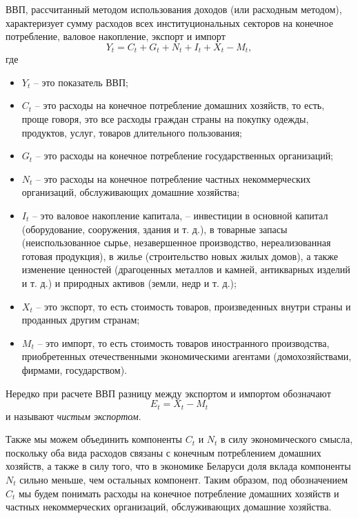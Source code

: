 \documentclass[a4paper, 14pt]{extreport}
\numberwithin{equation}{section}
\numberwithin{equation}{section}
\begin{document}
	ВВП, рассчитанный методом использования доходов (или расходным методом), характеризует сумму расходов всех институциональных секторов на конечное потребление, валовое накопление, экспорт и импорт
	\begin{equation}
		Y_t = C_t + G_t + N_t + I_t + X_t - M_t,
	\end{equation}
	где
	\begin{itemize}
		\item $Y_t$ -- это показатель ВВП;
		\item $C_t$ -- это расходы на конечное потребление домашних хозяйств, то есть, проще говоря, это все расходы граждан страны на покупку одежды, продуктов, услуг, товаров длительного пользования;
		\item $G_t$ -- это расходы на конечное потребление государственных организаций;
		\item $N_t$ -- это расходы на конечное потребление частных некоммерческих организаций, обслуживающих домашние хозяйства;
		\item $I_t$ -- это валовое накопление капитала, -- инвестиции  в основной капитал (оборудование, сооружения, здания и т. д.), в товарные запасы (неиспользованное сырье, незавершенное производство, нереализованная готовая продукция), в жилье (строительство новых жилых домов), а также изменение ценностей (драгоценных металлов и камней, антикварных изделий и т. д.) и природных активов (земли, недр и т. д.);
		\item $X_t$ -- это экспорт, то есть стоимость товаров, произведенных внутри страны и проданных другим странам;
		\item $M_t$ -- это импорт, то есть стоимость товаров иностранного производства, приобретенных отечественными экономическими агентами (домохозяйствами, фирмами, государством).
	\end{itemize}
	Нередко при расчете ВВП разницу между экспортом и импортом обозначают
	\begin{equation}
		E_t = X_t - M_t
	\end{equation}
	и называют \textit{чистым экспортом}.
	
	Также мы можем объединить компоненты $C_t$ и $N_t$ в силу экономического смысла, поскольку оба вида расходов связаны с конечным потреблением домашних хозяйств, а также в силу того, что в экономике Беларуси доля вклада компоненты $N_t$ сильно меньше, чем остальных компонент. Таким образом, под обозначением $C_t$ мы будем понимать расходы на конечное потребление домашних хозяйств и частных некоммерческих организаций, обслуживающих домашние хозяйства.
	
\end{document}
